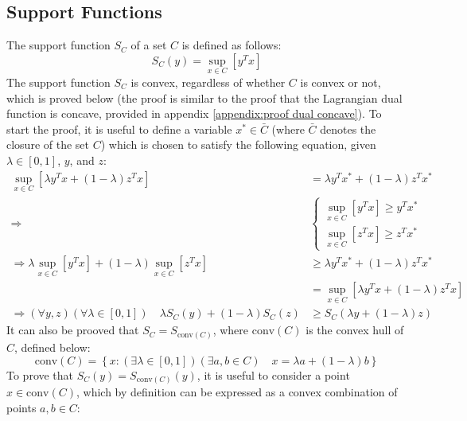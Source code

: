 \subsection{Support Functions}
The support function $S_C$ of a set $C$ is defined as follows:
\begin{equation}
    S_C(y) = \underset{x\in C}{\sup}\left[ y^T x \right] \label{eq:support function}
\end{equation}
The support function $S_C$ is convex, regardless of whether $C$ is convex or not, which is proved below (the proof is similar to the proof that the Lagrangian dual function is concave, provided in appendix \ref{appendix:proof dual concave}). To start the proof, it is useful to define a variable $x^*\in\bar{C}$ (where $\bar{C}$ denotes the closure of the set $C$) which is chosen to satisfy the following equation, given $\lambda\in[0, 1]$, $y$, and $z$:
\begin{align*}
    \underset{x\in C}{\sup}\left[ \lambda y^T x + (1-\lambda) z^T x \right] &= \lambda y^T x^* + (1-\lambda) z^T x^* \\
    \Rightarrow & \begin{cases}
        \underset{x\in C}{\sup}\left[ y^T x \right] \ge y^T x^* \\
        \underset{x\in C}{\sup}\left[ z^T x \right] \ge z^T x^*
    \end{cases} \\
    \Rightarrow \lambda \underset{x\in C}{\sup}\left[ y^T x \right] + (1 - \lambda) \underset{x\in C}{\sup}\left[ z^T x \right] &\ge \lambda y^T x^* + (1 - \lambda) z^T x^* \\
    &= \underset{x\in C}{\sup}\left[ \lambda y^T x + (1-\lambda) z^T x \right] \\
    \Rightarrow (\forall y, z)(\forall\lambda\in[0, 1]) \quad \lambda S_C(y) + (1 - \lambda) S_C(z) &\ge S_C( \lambda y + (1 - \lambda) z )
\end{align*}
It can also be prooved that $S_C = S_{\text{conv}(C)}$, where $\text{conv}(C)$ is the convex hull of $C$, defined below:
\begin{equation}
    \text{conv}(C) = \left\{ x:(\exists\lambda\in[0, 1])(\exists a, b \in C) \quad x = \lambda a + (1 - \lambda) b \right\}
\end{equation}
To prove that $S_C(y) = S_{\text{conv}(C)}(y)$, it is useful to consider a point $x\in \text{conv}(C)$, which by definition can be expressed as a convex combination of points $a, b \in C$:
